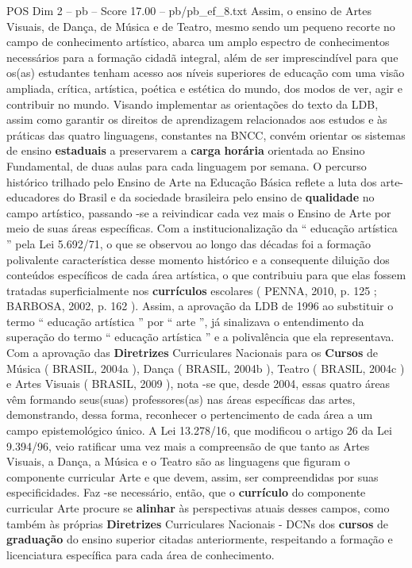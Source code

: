 \begin{textsample}{POS Dim 2 – pb – Score 17.00 – pb/pb\_ef\_8.txt}
Assim, o ensino de Artes Visuais, de Dança, de Música e de Teatro, mesmo sendo um pequeno recorte no campo de conhecimento artístico, abarca um amplo espectro de conhecimentos necessários para a formação cidadã integral, além de ser imprescindível para que os(as) estudantes tenham acesso aos níveis superiores de educação com uma visão ampliada, crítica, artística, poética e estética do mundo, dos modos de ver, agir e contribuir no mundo.
Visando implementar as orientações do texto da LDB, assim como garantir os direitos de aprendizagem relacionados aos estudos e às práticas das quatro linguagens, constantes na BNCC, convém orientar os sistemas de ensino \textbf{estaduais} a preservarem a \textbf{carga} \textbf{horária} orientada ao Ensino Fundamental, de duas aulas para cada linguagem por semana.
O percurso histórico trilhado pelo Ensino de Arte na Educação Básica reflete a luta dos arte-educadores do Brasil e da sociedade brasileira pelo ensino de \textbf{qualidade} no campo artístico, passando -se a reivindicar cada vez mais o Ensino de Arte por meio de suas áreas específicas.
Com a institucionalização da “ educação artística ” pela Lei 5.692/71, o que se observou ao longo das décadas foi a formação polivalente característica desse momento histórico e a consequente diluição dos conteúdos específicos de cada área artística, o que contribuiu para que elas fossem tratadas superficialmente nos \textbf{currículos} escolares ( PENNA, 2010, p. 125 ; BARBOSA, 2002, p. 162 ).
Assim, a aprovação da LDB de 1996 ao substituir o termo “ educação artística ” por “ arte ”, já sinalizava o entendimento da superação do termo “ educação artística ” e a polivalência que ela representava.
Com a aprovação das \textbf{Diretrizes} Curriculares Nacionais para os \textbf{Cursos} de Música ( BRASIL, 2004a ), Dança ( BRASIL, 2004b ), Teatro ( BRASIL, 2004c ) e Artes Visuais ( BRASIL, 2009 ), nota -se que, desde 2004, essas quatro áreas vêm formando seus(suas) professores(as) nas áreas específicas das artes, demonstrando, dessa forma, reconhecer o pertencimento de cada área a um campo epistemológico único.
A Lei 13.278/16, que modificou o artigo 26 da Lei 9.394/96, veio ratificar uma vez mais a compreensão de que tanto as Artes Visuais, a Dança, a Música e o Teatro são as linguagens que figuram o componente curricular Arte e que devem, assim, ser compreendidas por suas especificidades.
Faz -se necessário, então, que o \textbf{currículo} do componente curricular Arte procure se \textbf{alinhar} às perspectivas atuais desses campos, como também às próprias \textbf{Diretrizes} Curriculares Nacionais - DCNs dos \textbf{cursos} de \textbf{graduação} do ensino superior citadas anteriormente, respeitando a formação e licenciatura específica para cada área de conhecimento.

\end{textsample}

